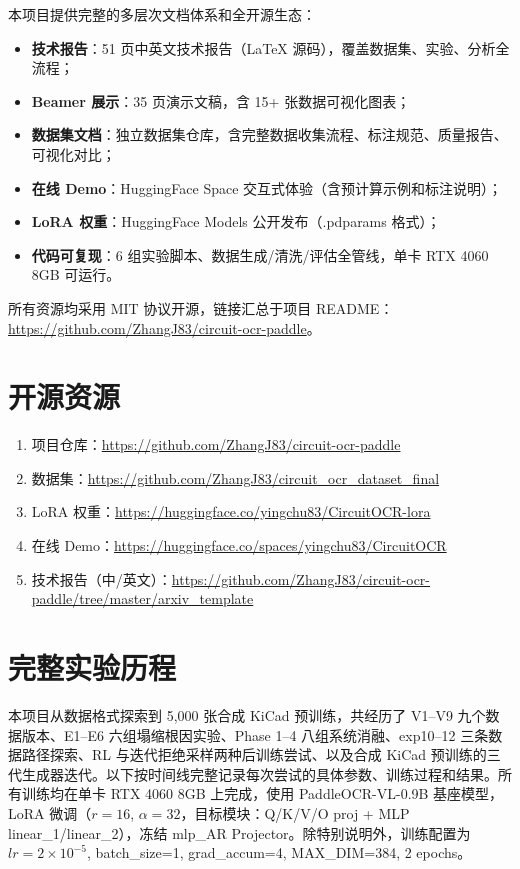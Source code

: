 本项目提供完整的多层次文档体系和全开源生态：

\begin{itemize}[nosep]
    \item \textbf{技术报告}：51 页中英文技术报告（LaTeX 源码），覆盖数据集、实验、分析全流程；
    \item \textbf{Beamer 展示}：35 页演示文稿，含 15+ 张数据可视化图表；
    \item \textbf{数据集文档}：独立数据集仓库，含完整数据收集流程、标注规范、质量报告、可视化对比；
    \item \textbf{在线 Demo}：HuggingFace Space 交互式体验（含预计算示例和标注说明）；
    \item \textbf{LoRA 权重}：HuggingFace Models 公开发布（.pdparams 格式）；
    \item \textbf{代码可复现}：6 组实验脚本、数据生成/清洗/评估全管线，单卡 RTX 4060 8GB 可运行。
\end{itemize}

所有资源均采用 MIT 协议开源，链接汇总于项目 README：\url{https://github.com/ZhangJ83/circuit-ocr-paddle}。

\section{开源资源}

\begin{enumerate}[nosep]
    \item 项目仓库：\url{https://github.com/ZhangJ83/circuit-ocr-paddle}
    \item 数据集：\url{https://github.com/ZhangJ83/circuit_ocr_dataset_final}
    \item LoRA 权重：\url{https://huggingface.co/yingchu83/CircuitOCR-lora}
    \item 在线 Demo：\url{https://huggingface.co/spaces/yingchu83/CircuitOCR}
    \item 技术报告（中/英文）：\url{https://github.com/ZhangJ83/circuit-ocr-paddle/tree/master/arxiv_template}
\end{enumerate}

\appendix
\section{完整实验历程}

本项目从数据格式探索到 5,000 张合成 KiCad 预训练，共经历了 V1--V9 九个数据版本、E1--E6 六组塌缩根因实验、Phase 1--4 八组系统消融、exp10--12 三条数据路径探索、RL 与迭代拒绝采样两种后训练尝试、以及合成 KiCad 预训练的三代生成器迭代。以下按时间线完整记录每次尝试的具体参数、训练过程和结果。所有训练均在单卡 RTX 4060 8GB 上完成，使用 PaddleOCR-VL-0.9B 基座模型，LoRA 微调（$r=16$, $\alpha=32$，目标模块：Q/K/V/O proj + MLP linear\_1/linear\_2），冻结 mlp\_AR Projector。除特别说明外，训练配置为 $lr=2\times10^{-5}$, batch\_size=1, grad\_accum=4, MAX\_DIM=384, 2 epochs。

